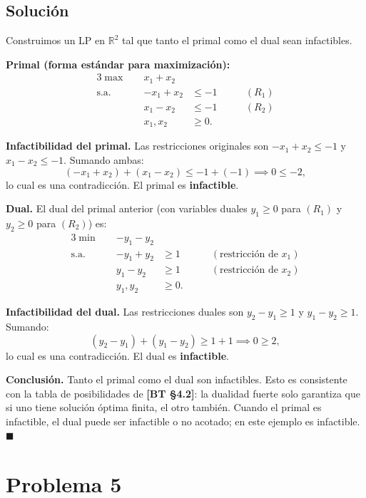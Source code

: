 \documentclass{article}
\begin{document}
\subsection*{Solución}

Construimos un LP en $\mathbb{R}^2$ tal que tanto el primal como el dual sean infactibles.

\medskip
\textbf{Primal (forma estándar para maximización):}
\begin{alignat*}{3}
  \max\quad & x_1 + x_2 & & \\
  \text{s.a.}\quad & {-x_1 + x_2} & \leq -1 & \qquad (R_1) \\
               & x_1 - x_2  & \leq -1 & \qquad (R_2) \\
               & x_1, x_2   & \geq 0. &
\end{alignat*}

\textbf{Infactibilidad del primal.} Las restricciones originales son $-x_1+x_2 \leq -1$ y $x_1-x_2 \leq -1$. Sumando ambas:
\[
  (-x_1+x_2) + (x_1-x_2) \leq -1 + (-1) \implies 0 \leq -2,
\]
lo cual es una contradicción. El primal es \textbf{infactible}.

\medskip
\textbf{Dual.} El dual del primal anterior (con variables duales $y_1 \geq 0$ para $(R_1)$ y $y_2 \geq 0$ para $(R_2)$) es:
\begin{alignat*}{3}
  \min\quad & -y_1 - y_2 & & \\
  \text{s.a.}\quad & {-y_1 + y_2} & \geq 1 & \qquad (\text{restricción de } x_1) \\
               & y_1 - y_2  & \geq 1 & \qquad (\text{restricción de } x_2) \\
               & y_1, y_2   & \geq 0. &
\end{alignat*}

\textbf{Infactibilidad del dual.} Las restricciones duales son $y_2 - y_1 \geq 1$ y $y_1 - y_2 \geq 1$. Sumando:
\[
  (y_2 - y_1) + (y_1 - y_2) \geq 1 + 1 \implies 0 \geq 2,
\]
lo cual es una contradicción. El dual es \textbf{infactible}.

\medskip
\textbf{Conclusión.} Tanto el primal como el dual son infactibles. Esto es consistente con la tabla de posibilidades de \textbf{[BT §4.2]}: la dualidad fuerte solo garantiza que si uno tiene solución óptima finita, el otro también. Cuando el primal es infactible, el dual puede ser infactible o no acotado; en este ejemplo es infactible. $\blacksquare$

\section*{Problema 5}
\end{document}
